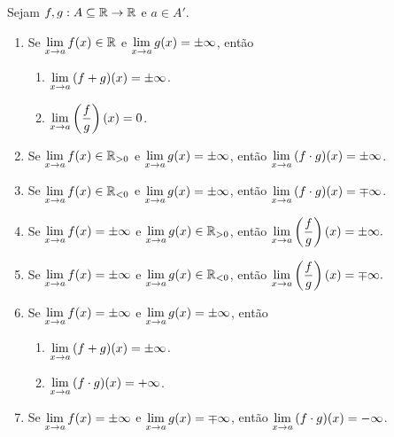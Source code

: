 \begin{proposition}
    Sejam $f,g : A \subseteq \mathbb{R} \to \mathbb{R}$ e $a \in A'$.
        \begin{enumerate}[leftmargin=*, align=left, label=\textbf{(\alph*)}]
            \item Se $\displaystyle \lim_{x \to a} f(x) \in \mathbb{R}$ e $\displaystyle \lim_{x \to a} g(x) = \pm \infty$, então
                \begin{enumerate}[label=\roman*.]
                    \item $\displaystyle \lim_{x \to a} \, (f+g)(x) = \pm \infty$.
                    \item $\displaystyle \lim_{x \to a} \left(\dfrac{f}{g} \right)(x) = 0$.
                \end{enumerate}
            \item Se $\displaystyle \lim_{x \to a} f(x) \in \mathbb{R}_{>0}$ e $\displaystyle \lim_{x \to a} g(x) = \pm \infty$, então $\displaystyle \lim_{x \to a} \, (f \cdot g)(x) = \pm \infty$.
            \item Se $\displaystyle \lim_{x \to a} f(x) \in \mathbb{R}_{<0}$ e $\displaystyle \lim_{x \to a} g(x) = \pm \infty$, então $\displaystyle \lim_{x \to a} \, (f \cdot g)(x) = \mp \infty$.
            \item Se $\displaystyle \lim_{x \to a} f(x)=\pm\infty$ e $\displaystyle \lim_{x \to a} g(x)\in\mathbb{R}_{>0}$, então
                $\displaystyle
                    \lim_{x\to a}\left(\frac{f}{g}\right)(x)=\pm\infty.
                $
            \item Se $\displaystyle \lim_{x \to a} f(x)=\pm\infty$ e $\displaystyle \lim_{x \to a} g(x)\in\mathbb{R}_{<0}$, então
                $\displaystyle
                    \lim_{x\to a}\left(\frac{f}{g}\right)(x)=\mp\infty.
                $
            \item Se $\displaystyle \lim_{x \to a} f(x) = \pm \infty$ e $\displaystyle \lim_{x \to a} g(x) = \pm \infty$, então
                \begin{enumerate}[label=\roman*.]
                    \item $\displaystyle \lim_{x \to a} \, (f+g)(x) = \pm \infty$.
                    \item $\displaystyle \lim_{x \to a} \, (f \cdot g)(x) = + \infty$.
                \end{enumerate}
            \item Se $\displaystyle \lim_{x \to a} f(x) = \pm \infty$ e $\displaystyle \lim_{x \to a} g(x) = \mp \infty$, então $\displaystyle \lim_{x \to a} \, (f \cdot g)(x) = - \infty$.
        \end{enumerate}
\end{proposition}

